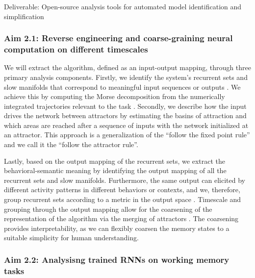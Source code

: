 \documentclass[12pt,letterpaper, onecolumn]{article}
\theoremstyle{definition}
\theoremstyle{remark}
\begin{document}
\noindent
Deliverable: Open-source analysis tools for automated model identification and simplification

\subsubsection*{Aim 2.1: Reverse engineering and coarse-graining neural computation on different timescales}
We will extract the algorithm, defined as an input-output mapping, through three primary analysis components.
Firstly, we identify the system's recurrent sets and slow manifolds that correspond to meaningful input sequences or outputs \citep{goudar2018}. 
We achieve this by computing the Morse decomposition from the numerically integrated trajectories relevant to the task \citep{mischaikow1999, arai2009database}.
Secondly, we describe how the input drives the network between attractors by estimating the basins of attraction and which areas are reached after a sequence of inputs with the network initialized at an attractor. 
This approach is a generalization of the ``follow the fixed point rule'' \citep{sussillo2013blackbox} and we call it the ``follow the attractor rule''.


Lastly, based on the output mapping of the recurrent sets, we extract the behavioral-semantic meaning by identifying the output mapping of all the recurrent sets and slow manifolds. Furthermore, the same output can elicited by different activity patterns in different behaviors or contexts, and we, therefore, group recurrent sets according to a metric in the output space \citep{athalye2023, myers2022}.
Timescale and grouping through the output mapping allow for the coarsening of the representation of the algorithm via the merging of attractors \citep{braun2010}.
The coarsening provides interpretability, as we can flexibly coarsen the memory states to a suitable simplicity for human understanding.

%
\subsubsection*{Aim 2.2: Analysisng trained RNNs on working memory tasks}
\end{document}
